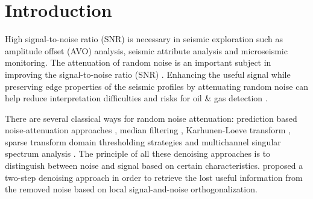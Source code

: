 \section{Introduction}
High signal-to-noise ratio (SNR) is necessary  in seismic exploration such as amplitude  offset (AVO) analysis, seismic attribute analysis and microseismic monitoring. The attenuation of random noise is an important subject in improving the signal-to-noise ratio (SNR) \cite[]{yangkang20141}.  Enhancing the useful signal while preserving edge properties of the seismic profiles by attenuating random noise can help reduce interpretation difficulties and risks for oil \& gas detection \cite[]{shuwei2015,wencheng2015asa}. 

There are several classical ways for random\dlo{-} noise attenuation: prediction based noise-attenuation approaches \cite[]{abma1995,guochang20112} , median filtering \cite[]{yike2013,yangkang2014svmf,shuwei2016}, Karhunen-Loeve transform \cite[]{jones1987}, sparse transform domain thresholding strategies \cite[]{donoho1995,neelamani2008,fomel2010seislet,yangkang20142,yangkang2016dsd} and  multichannel singular spectrum analysis \cite[]{mssa,stephen2013,jianjun2013}. The principle of all these denoising approaches is to distinguish between noise and signal based on certain characteristics.  \cite{yangkang2015ortho} proposed a two-step denoising approach in order to retrieve the lost useful information from the removed noise based on local signal-and-noise orthogonalization.

